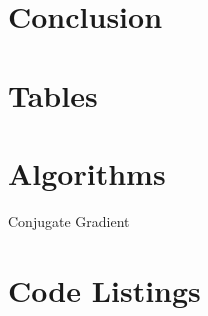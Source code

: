 \iffalse
Results:
Graphs, errors, convergence rates,
\fi


\section{Conclusion}

\iffalse
    Conclusion draws together strands of work throughout the report, 
    demonstrating how the results obtained relate to each other and 
    the broader context of the mathematical problem.

Discussion of results in context of problem
Talk about related algorithms
> BiCG
> CG squared
Preconditioning
Parallelisation, optimisations
Results
\fi

\clearpage
\appendix
\section{Tables}


\section{Algorithms}


\begin{algorithm}[H]



\caption{Conjugate Gradient}
\label{alg:cg}
\end{algorithm}


\section{Code Listings}
